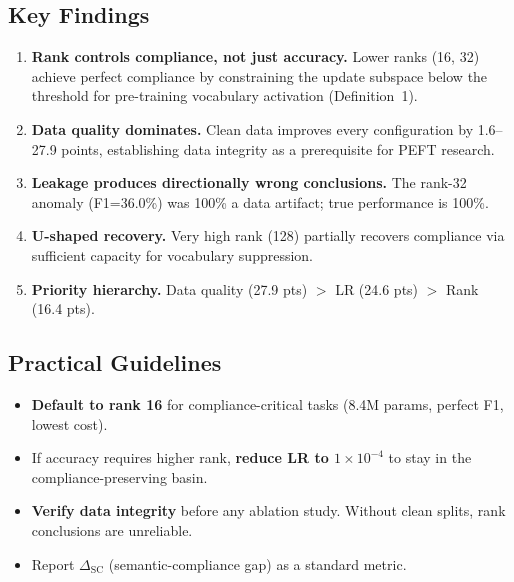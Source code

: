 \documentclass[journal]{IEEEtran}
\begin{document}
\subsection{Key Findings}
\begin{enumerate}
\item \textbf{Rank controls compliance, not just accuracy.} Lower ranks (16, 32) achieve perfect compliance by constraining the update subspace below the threshold for pre-training vocabulary activation (Definition~1).
\item \textbf{Data quality dominates.} Clean data improves every configuration by 1.6--27.9 points, establishing data integrity as a prerequisite for PEFT research.
\item \textbf{Leakage produces directionally wrong conclusions.} The rank-32 anomaly (F1=36.0\%) was 100\% a data artifact; true performance is 100\%.
\item \textbf{U-shaped recovery.} Very high rank (128) partially recovers compliance via sufficient capacity for vocabulary suppression.
\item \textbf{Priority hierarchy.} Data quality (27.9 pts) $>$ LR (24.6 pts) $>$ Rank (16.4 pts).
\end{enumerate}

\subsection{Practical Guidelines}
\begin{itemize}
\item \textbf{Default to rank 16} for compliance-critical tasks (8.4M params, perfect F1, lowest cost).
\item If accuracy requires higher rank, \textbf{reduce LR to $1\times10^{-4}$} to stay in the compliance-preserving basin.
\item \textbf{Verify data integrity} before any ablation study. Without clean splits, rank conclusions are unreliable.
\item Report $\Delta_\text{SC}$ (semantic-compliance gap) as a standard metric.
\end{itemize}
\end{document}

